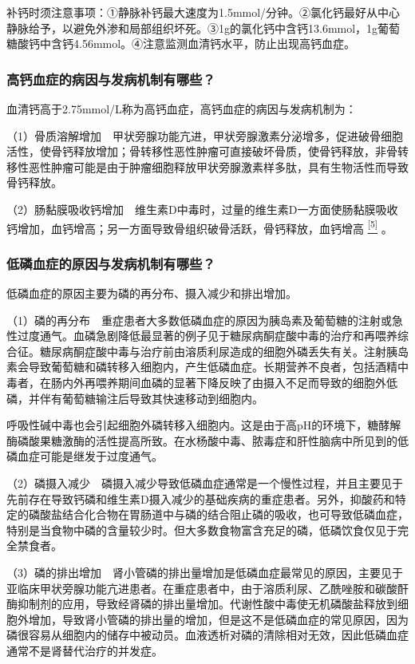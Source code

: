 补钙时须注意事项：①静脉补钙最大速度为1.5mmol/分钟。②氯化钙最好从中心静脉给予，以避免外渗和局部组织坏死。③1g的氯化钙中含钙13.6mmol，1g葡萄糖酸钙中含钙4.56mmol。④注意监测血清钙水平，防止出现高钙血症。

\subsubsection{高钙血症的病因与发病机制有哪些？}

血清钙高于2.75mmol/L称为高钙血症，高钙血症的病因与发病机制为：

（1）骨质溶解增加　甲状旁腺功能亢进，甲状旁腺激素分泌增多，促进破骨细胞活性，使骨钙释放增加；骨转移性恶性肿瘤可直接破坏骨质，使骨钙释放，非骨转移性恶性肿瘤可能是由于肿瘤细胞释放甲状旁腺激素样多肽，具有生物活性而导致骨钙释放。

（2）肠黏膜吸收钙增加　维生素D中毒时，过量的维生素D一方面使肠黏膜吸收钙增加，血钙增高；另一方面导致骨组织破骨活跃，骨钙释放，血钙增高
\protect\hyperlink{text00025.htmlux5cux23ch5-24}{\textsuperscript{{[}5{]}}}
。

\subsubsection{低磷血症的原因与发病机制有哪些？}

低磷血症的原因主要为磷的再分布、摄入减少和排出增加。

（1）磷的再分布　重症患者大多数低磷血症的原因为胰岛素及葡萄糖的注射或急性过度通气。血磷急剧降低最显著的例子见于糖尿病酮症酸中毒的治疗和再喂养综合征。糖尿病酮症酸中毒与治疗前由溶质利尿造成的细胞外磷丢失有关。注射胰岛素会导致葡萄糖和磷转移入细胞内，产生低磷血症。长期营养不良者，包括酒精中毒者，在肠内外再喂养期间血磷的显著下降反映了由摄入不足而导致的细胞外低磷，并伴有葡萄糖输注后导致其快速移动到细胞内。

呼吸性碱中毒也会引起细胞外磷转移入细胞内。这是由于高pH的环境下，糖酵解酶磷酸果糖激酶的活性提高所致。在水杨酸中毒、脓毒症和肝性脑病中所见到的低磷血症可能是继发于过度通气。

（2）磷摄入减少　磷摄入减少导致低磷血症通常是一个慢性过程，并且主要见于先前存在导致钙磷和维生素D摄入减少的基础疾病的重症患者。另外，抑酸药和特定的磷酸盐结合化合物在胃肠道中与磷的结合阻止磷的吸收，也可导致低磷血症，特别是当食物中磷的含量较少时。但大多数食物富含充足的磷，低磷饮食仅见于完全禁食者。

（3）磷的排出增加　肾小管磷的排出量增加是低磷血症最常见的原因，主要见于亚临床甲状旁腺功能亢进患者。在重症患者中，由于溶质利尿、乙酰唑胺和碳酸酐酶抑制剂的应用，导致经肾磷的排出量增加。代谢性酸中毒使无机磷酸盐释放到细胞外增加，导致肾小管磷的排出量的增加，但是这不是低磷血症的常见原因，因为磷很容易从细胞内的储存中被动员。血液透析对磷的清除相对无效，因此低磷血症通常不是肾替代治疗的并发症。

